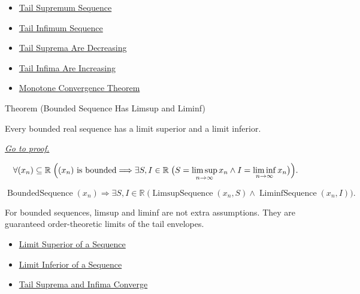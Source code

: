 \begin{remark*}[Dependencies]\hfill
\begin{itemize}
  \item \hyperref[def:tail-supremum-sequence]{Tail Supremum Sequence}
  \item \hyperref[def:tail-infimum-sequence]{Tail Infimum Sequence}
  \item \hyperref[thm:tail-suprema-are-decreasing]{Tail Suprema Are Decreasing}
  \item \hyperref[thm:tail-infima-are-increasing]{Tail Infima Are Increasing}
  \item \hyperref[thm:monotone-convergence-theorem]{Monotone Convergence Theorem}
\end{itemize}
\end{remark*}


\begin{theorembox}{Theorem (Bounded Sequence Has Limsup and Liminf)}
\begin{theorem}
\label{thm:bounded-sequence-has-limsup-and-liminf}
Every bounded real sequence has a limit superior and a limit inferior.

\smallskip
\noindent
\hyperref[prf:bounded-sequence-has-limsup-and-liminf]{\textit{Go to proof.}}
\end{theorem}
\end{theorembox}

\begin{remark*}
\[
\forall (x_n)\subseteq\mathbb{R}\;
\Bigl(
  (x_n)\text{ is bounded}
  \Longrightarrow
  \exists S,I\in\mathbb{R}\;
  \bigl(S=\limsup_{n\to\infty}x_n
  \land I=\liminf_{n\to\infty}x_n\bigr)
\Bigr).
\]
\end{remark*}

\begin{remark*}
\[
\operatorname{BoundedSequence}(x_n)
\Longrightarrow
\exists S,I\in\mathbb{R}\;
\bigl(
  \operatorname{LimsupSequence}(x_n,S)
  \land
  \operatorname{LiminfSequence}(x_n,I)
\bigr).
\]
\end{remark*}

\begin{remark*}[Interpretation]
For bounded sequences, limsup and liminf are not extra assumptions. They are
guaranteed order-theoretic limits of the tail envelopes.
\end{remark*}

\begin{remark*}[Dependencies]\hfill
\begin{itemize}
  \item \hyperref[def:limsup-sequence]{Limit Superior of a Sequence}
  \item \hyperref[def:liminf-sequence]{Limit Inferior of a Sequence}
  \item \hyperref[thm:tail-suprema-and-infima-converge]{Tail Suprema and Infima Converge}
\end{itemize}
\end{remark*}